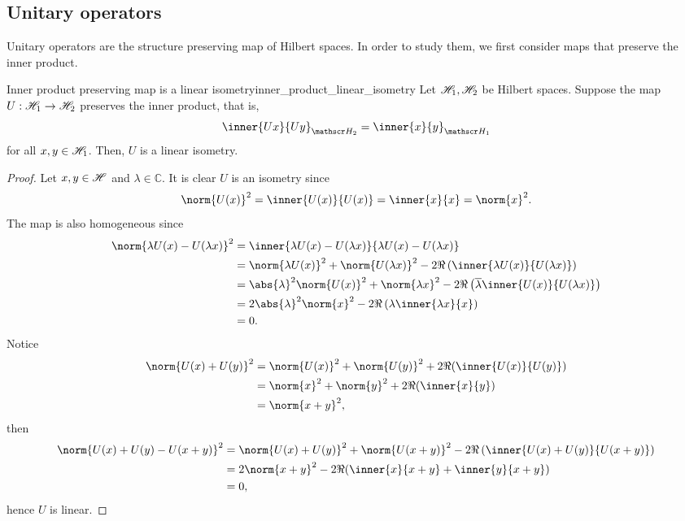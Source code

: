 \subsection{Unitary operators}
Unitary operators are the structure preserving map of Hilbert spaces. In order to study them, we first consider maps that preserve the inner product.
\begin{lemma}{Inner product preserving map is a linear isometry}{inner_product_linear_isometry}
    Let \(\mathscr{H}_1, \mathscr{H}_2\) be Hilbert spaces. Suppose the map \(U : \mathscr{H}_1 \to \mathscr{H}_2\) preserves the inner product, that is,
    \begin{equation*}
        \inner{Ux}{Uy}_{\hilbert_2} = \inner{x}{y}_{\hilbert_1}
    \end{equation*}
    for all \(x, y \in \mathscr{H}_1\). Then, \(U\) is a linear isometry.
\end{lemma}
\begin{proof}
    Let \(x, y \in \mathscr{H}\) and \(\lambda \in \mathbb{C}\). It is clear \(U\) is an isometry since
    \begin{equation*}
        \norm{U(x)}^2 = \inner{U(x)}{U(x)} = \inner{x}{x} = \norm{x}^2.
    \end{equation*}
    The map is also homogeneous since
    \begin{align*}
        \norm{\lambda U(x) - U(\lambda x)}^2
        &= \inner{\lambda U(x) - U(\lambda x)}{\lambda U(x) - U(\lambda x)}\\
        &= \norm{\lambda U(x)}^2 + \norm{U(\lambda x)}^2 - 2\Re\left(\inner{\lambda U(x)}{U(\lambda x)}\right)\\
        &= \abs{\lambda}^2\norm{U(x)}^2 + \norm{\lambda x}^2 - 2\Re\left(\conj{\lambda} \inner{U(x)}{U(\lambda x)}\right)\\
        &= 2\abs{\lambda}^2 \norm{x}^2 - 2\Re\left(\lambda \inner{\lambda x}{x}\right)\\
        &= 0.
    \end{align*}
    Notice
    \begin{align*}
        \norm{U(x) + U(y)}^2 &= \norm{U(x)}^2 + \norm{U(y)}^2 + 2\Re(\inner{U(x)}{U(y)})\\
                             &= \norm{x}^2 + \norm{y}^2 + 2\Re(\inner{x}{y})\\
                             &= \norm{x + y}^2,
    \end{align*}
    then
    \begin{align*}
        \norm{U(x) + U(y) - U(x + y)}^2
        &= \norm{U(x) + U(y)}^2 + \norm{U(x+y)}^2 - 2\Re\left(\inner{U(x) + U(y)}{U(x + y)}\right)\\
        &=2\norm{x+y}^2 - 2\Re(\inner{x}{x+y} + \inner{y}{x+y})\\
        &= 0,
    \end{align*}
    hence \(U\) is linear.
\end{proof}
